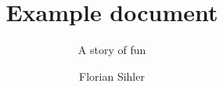 \documentclass{pnp-skywrath}
\title{Example document}
\subtitle{A story of fun}
\author{Florian Sihler}
\begin{document}
    \maketitle
    \TableOfContents

    \Blinddocument
\end{document}
